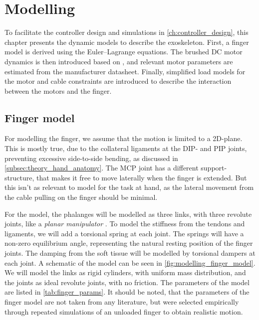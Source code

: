 \chapter{Modelling}%
\label{ch:modelling}

To facilitate the controller design and simulations in \cref{ch:controller_design}, this chapter presents the dynamic models to describe the exoskeleton. First, a finger model is derived using the Euler--Lagrange equations. The brushed DC motor dynamics is then introduced based on \textcite{rahmanMathematicalModelBrushed2021}, and relevant motor parameters are estimated from the manufacturer datasheet. Finally, simplified load models for the motor and cable constraints are introduced to describe the interaction between the motors and the finger.


\section{Finger model}%
\label{sec:finger_model}

For modelling the finger, we assume that the motion is limited to a 2D-plane. This is mostly true, due to the collateral ligaments at the DIP- and PIP joints, preventing excessive side-to-side bending, as discussed in \cref{subsec:theory_hand_anatomy}. The MCP joint has a different support-structure, that makes it free to move laterally when the finger is extended. But this isn't as relevant to model for the task at hand, as the lateral movement from the cable pulling on the finger should be minimal.

For the model, the phalanges will be modelled as three links, with three revolute joints, like a \textit{planar manipulator} \parencite{PlanarManipulatorOverview}. To model the stiffness from the tendons and ligaments, we will add a torsional spring at each joint. The springs will have a non-zero equilibrium angle, representing the natural resting position of the finger joints. The damping from the soft tissue will be modelled by torsional dampers at each joint. A schematic of the model can be seen in \cref{fig:modelling_finger_model}. We will model the links as rigid cylinders, with uniform mass distribution, and the joints as ideal revolute joints, with no friction. The parameters of the model are listed in \cref{tab:finger_params}. It should be noted, that the parameters of the finger model are not taken from any literature, but were selected empirically through repeated simulations of an unloaded finger to obtain realistic motion. 

